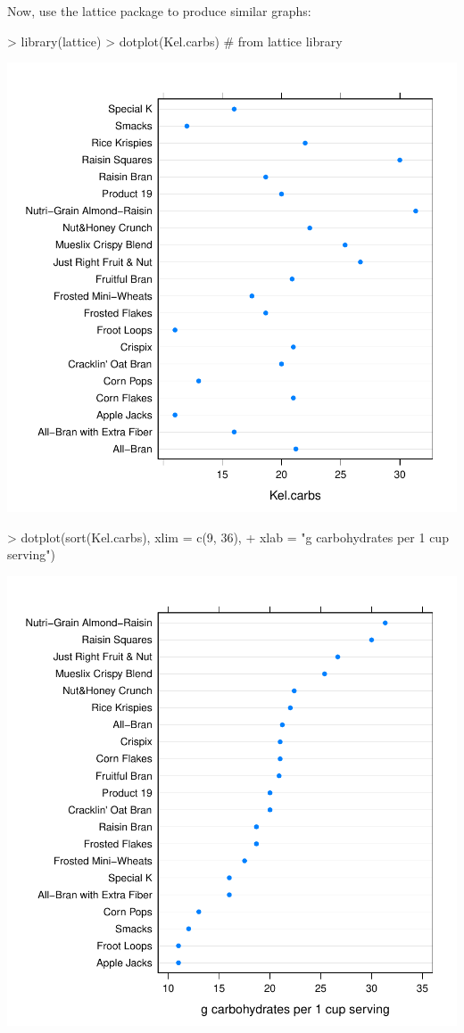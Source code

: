 \documentclass[12pt,letterpaper,final]{article}
\begin{document}
Now, use the lattice package to produce similar graphs:

\begin{Schunk}
\begin{Sinput}
> library(lattice)
> dotplot(Kel.carbs)  # from lattice library
\end{Sinput}
\end{Schunk}
\includegraphics{lect_main-020}

\begin{Schunk}
\begin{Sinput}
> dotplot(sort(Kel.carbs), xlim = c(9, 36), 
+   xlab = "g carbohydrates per 1 cup serving")
\end{Sinput}
\end{Schunk}
\includegraphics{lect_main-021}
\end{document}
